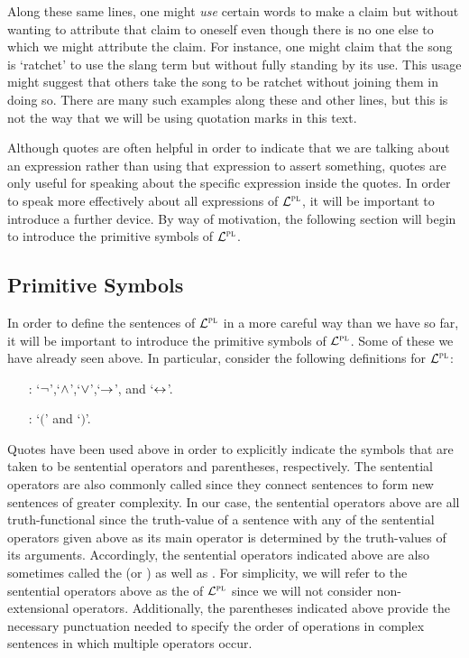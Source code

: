 Along these same lines, one might \textit{use} certain words to make a claim but without wanting to attribute that claim to oneself even though there is no one else to which we might attribute the claim.
For instance, one might claim that the song is `ratchet' to use the slang term but without fully standing by its use.
This usage might suggest that others take the song to be ratchet without joining them in doing so.
There are many such examples along these and other lines, but this is not the way that we will be using quotation marks in this text.

Although quotes are often helpful in order to indicate that we are talking about an expression rather than using that expression to assert something, quotes are only useful for speaking about the specific expression inside the quotes.
In order to speak more effectively about all expressions of $\mathcal{L}^{\textsc{pl}}$, it will be important to introduce a further device. 
By way of motivation, the following section will begin to introduce the primitive symbols of $\mathcal{L}^{\textsc{pl}}$.




\subsection{Primitive Symbols}
  \label{sub.primitives}

In order to define the sentences of $\mathcal{L}^{\textsc{pl}}$ in a more careful way than we have so far, it will be important to introduce the primitive symbols of $\mathcal{L}^{\textsc{pl}}$. 
Some of these we have already seen above.
In particular, consider the following definitions for $\mathcal{L}^{\textsc{pl}}$:

\begin{enumerate}[leftmargin=2.25in, itemsep=-.4em]
  \item[\define{sentential operators}:] `$\neg$',`$\wedge$',`$\vee$',`$\rightarrow$', and `$\leftrightarrow$'.
  \item[\define{punctuation}:] `$($' and `$)$'.
\end{enumerate}

Quotes have been used above in order to explicitly indicate the symbols that are taken to be sentential operators and parentheses, respectively.
The sentential operators are also commonly called  since they connect sentences to form new sentences of greater complexity.
In our case, the sentential operators above are all truth-functional since the truth-value of a sentence with any of the sentential operators given above as its main operator is determined by the truth-values of its arguments.
Accordingly, the sentential operators indicated above are also sometimes called the  (or ) as well as .
For simplicity, we will refer to the sentential operators above as the  of $\mathcal{L}^{\textsc{pl}}$ since we will not consider non-extensional operators.
Additionally, the parentheses indicated above provide the necessary punctuation needed to specify the order of operations in complex sentences in which multiple operators occur.

